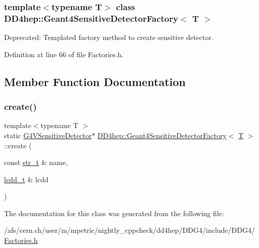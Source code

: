 \subsubsection*{template$<$typename T$>$\newline
class D\+D4hep\+::\+Geant4\+Sensitive\+Detector\+Factory$<$ T $>$}

Deprecated\+: Templated factory method to create sensitive detector. 

Definition at line 66 of file Factories.\+h.



\subsection{Member Function Documentation}
\hypertarget{class_d_d4hep_1_1_geant4_sensitive_detector_factory_a2a64f7e0f2f4ca7076b273b7725b6717}{}\label{class_d_d4hep_1_1_geant4_sensitive_detector_factory_a2a64f7e0f2f4ca7076b273b7725b6717} 
\subsubsection{\texorpdfstring{create()}{create()}}
{\footnotesize\ttfamily template$<$typename T $>$ \\
static \hyperlink{class_g4_v_sensitive_detector}{G4\+V\+Sensitive\+Detector}$\ast$ \hyperlink{class_d_d4hep_1_1_geant4_sensitive_detector_factory}{D\+D4hep\+::\+Geant4\+Sensitive\+Detector\+Factory}$<$ \hyperlink{class_t}{T} $>$\+::create (\begin{DoxyParamCaption}\item[{const \hyperlink{struct_d_d4hep_1_1_plugin_factory_base_aaa4c6d8801f70db2776c5473abc92692}{str\+\_\+t} \&}]{name,  }\item[{\hyperlink{struct_d_d4hep_1_1_plugin_factory_base_a61b840cc18cdd24ae2e383da306b9c9a}{lcdd\+\_\+t} \&}]{lcdd }\end{DoxyParamCaption})\hspace{0.3cm}{\ttfamily [static]}}



The documentation for this class was generated from the following file\+:\begin{DoxyCompactItemize}
\item 
/afs/cern.\+ch/user/m/mpetric/nightly\+\_\+cppcheck/dd4hep/\+D\+D\+G4/include/\+D\+D\+G4/\hyperlink{_d_d_g4_2include_2_d_d_g4_2_factories_8h}{Factories.\+h}\end{DoxyCompactItemize}

